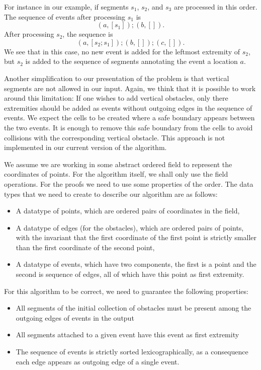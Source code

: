 \documentclass{easychair}
\begin{document}
For instance in our example, if segments \(s_1\), \(s_2\), and \(s_3\) are
processed in this order.  The sequence of events after processing \(s_1\) is
\[ (a, [s_1]); (b, []).\]
After processing \(s_2\), the sequence is
\[ (a, [s_2; s_1]); (b, []); (c, []). \]
We see that in this case, no new event is added for the leftmost extremity
of \(s_2\), but \(s_2\) is added to the sequence of segments annotating the
event a location \(a\).

Another simplification to our presentation of the problem is that
vertical segments are not allowed in our input.  Again, we think that
it is possible to work around this limitation: If one wishes to add
vertical obstacles, only there extremities should be added as events
without outgoing edges in the sequence of events.  We expect the
cells to be created where a safe boundary appears between the two
events.  It is enough to remove this safe boundary from the cells to
avoid collisions with the corresponding vertical obstacle.  This
approach is not implemented in our current version of the algorithm.

We assume we are working in some abstract ordered field to represent the
coordinates of points.  For the algorithm itself, we shall only use the field
operations.  For the proofs we need to use some properties of the order.
The data types that we need to create to describe our algorithm are as
follows:
\begin{itemize}
\item A datatype of points, which are ordered pairs of coordinates in the field,
\item A datatype of edges (for the obstacles), which are ordered pairs of
  points, with the invariant that the first coordinate of the first
  point is strictly smaller than the first coordinate of the second point,
\item A datatype of events, which have two components, the first is a
  point and the second is sequence of edges, all of which have this
  point as first extremity.
\end{itemize}
For this algorithm to be correct, we need to guarantee the following
properties:
\begin{itemize}
\item All segments of the initial collection of obstacles must be
  present among the outgoing edges of events in the output
\item All segments attached to a given event have this event as first
  extremity
\item The sequence of events is strictly sorted lexicographically, as
  a consequence each edge appears as outgoing edge of a single event.
\end{itemize}
\end{document}
